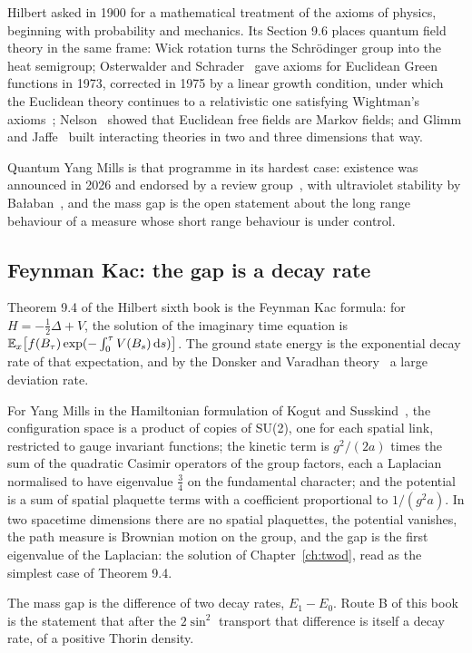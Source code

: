 Hilbert asked in 1900 for a mathematical treatment of the axioms of physics, beginning with probability and mechanics. Its Section 9.6 places quantum field theory in the same frame: Wick rotation turns the Schr\"odinger group into the heat semigroup; Osterwalder and Schrader~\cite{OS} gave axioms for Euclidean Green functions in 1973, corrected in 1975 by a linear growth condition, under which the Euclidean theory continues to a relativistic one satisfying Wightman's axioms~\cite{SW64}; Nelson~\cite{Ne73} showed that Euclidean free fields are Markov fields; and Glimm and Jaffe~\cite{GJ} built interacting theories in two and three dimensions that way.

Quantum Yang Mills is that programme in its hardest case: existence was announced in 2026 and endorsed by a review group~\cite{OAI}, with ultraviolet stability by Ba\l aban~\cite{Ba87}, and the mass gap is the open statement about the long range behaviour of a measure whose short range behaviour is under control.

\subsection{Feynman Kac: the gap is a decay rate}

Theorem 9.4 of the Hilbert sixth book is the Feynman Kac formula: for $H=-\frac12\Delta+V$, the solution of the imaginary time equation is $\mathbb{E}_x\big[f(B_\tau)\exp(-\int_0^\tau V(B_s)\,\mathrm ds)\big]$. The ground state energy is the exponential decay rate of that expectation, and by the Donsker and Varadhan theory~\cite{DV75} a large deviation rate.

For Yang Mills in the Hamiltonian formulation of Kogut and Susskind~\cite{KS75}, the configuration space is a product of copies of SU(2), one for each spatial link, restricted to gauge invariant functions; the kinetic term is $g^2/(2a)$ times the sum of the quadratic Casimir operators of the group factors, each a Laplacian normalised to have eigenvalue $\frac34$ on the fundamental character; and the potential is a sum of spatial plaquette terms with a coefficient proportional to $1/(g^2a)$. In two spacetime dimensions there are no spatial plaquettes, the potential vanishes, the path measure is Brownian motion on the group, and the gap is the first eigenvalue of the Laplacian: the solution of Chapter~\ref{ch:twod}, read as the simplest case of Theorem 9.4.

The mass gap is the difference of two decay rates, $E_1-E_0$. Route B of this book is the statement that after the $2\sin^2$ transport that difference is itself a decay rate, of a positive Thorin density.

